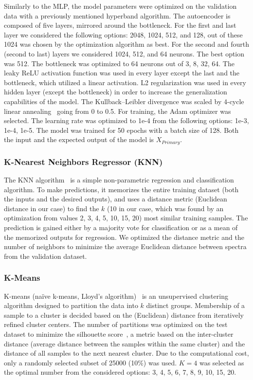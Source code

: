\documentclass[preprint,11pt]{elsarticle}
\begin{document}
Similarly to the MLP, the model parameters were optimized on the validation data with a previously mentioned hyperband algorithm. The autoencoder is composed of five layers, mirrored around the bottleneck. For the first and last layer we considered the following options: 2048, 1024, 512, and 128, out of these 1024 was chosen by the optimization algorithm as best. For the second and fourth (second to last) layers we considered 1024, 512, and 64 neurons. The best option was 512. The bottleneck was optimized to 64 neurons out of 3, 8, 32, 64. The leaky ReLU activation function was used in every layer except the last and the bottleneck, which utilized a linear activation. L2 regularization was used in every hidden layer (except the bottleneck) in order to increase the generalization capabilities of the model. The Kullback–Leibler divergence was scaled by 4-cycle linear annealing~\cite{fu2019cyclical} going from 0 to 0.5. For training, the Adam optimizer was selected. The learning rate was optimized to 1e-4 from the following options: 1e-3, 1e-4, 1e-5. The model was trained for 50 epochs with a batch size of 128. Both the input and the expected output of the model is $X_{Primary}$.



\subsubsection{K-Nearest Neighbors Regressor (KNN)}
\label{sec:knn}
\noindent
The KNN algorithm~\cite{altman1992introduction} is a simple non-parametric regression and classification algorithm. To make predictions, it memorizes the entire training dataset (both the inputs and the desired outputs), and uses a distance metric (Euclidean distance in our case) to find the $k$ (10 in our case, which was found by an optimization from values 2, 3, 4, 5, 10, 15, 20) most similar training samples. The prediction is gained either by a majority vote for classification or as a mean of the memorized outputs for regression. We optimized the distance metric and the number of neighbors to minimize the average Euclidean distance between spectra from the validation dataset.



\subsubsection{K-Means}
\label{sec:kmeans}
\noindent
K-means (na\"ive k-means, Lloyd’s algorithm)~\cite{1056489} is an unsupervised clustering algorithm designed to partition the data into $k$ distinct groups. Membership of a sample to a cluster is decided based on the (Euclidean) distance from iteratively refined cluster centers.
The number of partitions was optimized on the test dataset to minimize the silhouette score~\cite{rousseeuw1987silhouettes}, a metric based on the inter-cluster distance (average distance between the samples within the same cluster) and the distance of all samples to the next nearest cluster. Due to the computational cost, only a randomly selected subset of 25000 (10\%) was used. $K = 4$ was selected as the optimal number from the considered options: 3, 4, 5, 6, 7, 8, 9, 10, 15, 20.
\end{document}
